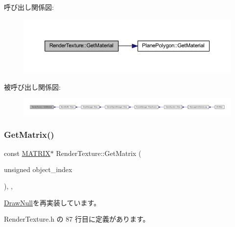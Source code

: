 呼び出し関係図\+:\nopagebreak
\begin{figure}[H]
\begin{center}
\leavevmode
\includegraphics[width=350pt]{class_render_texture_adb19f86d2ac55e95d8725c64a846e8d0_cgraph}
\end{center}
\end{figure}
被呼び出し関係図\+:
\nopagebreak
\begin{figure}[H]
\begin{center}
\leavevmode
\includegraphics[width=350pt]{class_render_texture_adb19f86d2ac55e95d8725c64a846e8d0_icgraph}
\end{center}
\end{figure}
\mbox{\label{class_render_texture_a0e9746f5cebdd088f2303e18cbc52eae}} 
\subsubsection{\texorpdfstring{Get\+Matrix()}{GetMatrix()}}
{\footnotesize\ttfamily const \mbox{\hyperlink{_vector3_d_8h_a032295cd9fb1b711757c90667278e744}{M\+A\+T\+R\+IX}}$\ast$ Render\+Texture\+::\+Get\+Matrix (\begin{DoxyParamCaption}\item[{unsigned}]{object\+\_\+index }\end{DoxyParamCaption})\hspace{0.3cm}{\ttfamily [inline]}, {\ttfamily [override]}, {\ttfamily [virtual]}}



\mbox{\hyperlink{class_draw_null_adede079e9c11a756090740b20bb43022}{Draw\+Null}}を再実装しています。



 Render\+Texture.\+h の 87 行目に定義があります。

